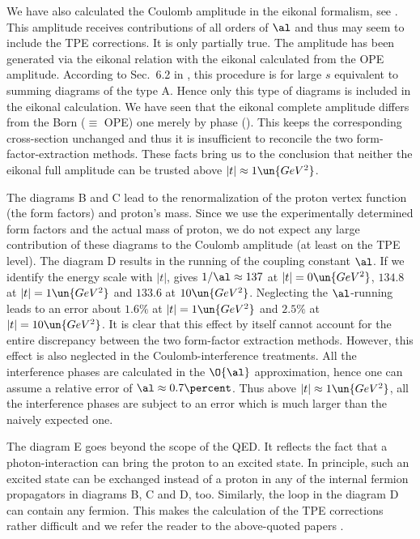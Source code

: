 We have also calculated the Coulomb amplitude in the eikonal formalism, see . This amplitude receives contributions of all orders of $\al$ and thus may seem to include the TPE corrections. It is only partially true. The amplitude has been generated via the eikonal relation  with the eikonal calculated from the OPE amplitude. According to Sec.~6.2 in , this procedure is for large $s$ equivalent to summing diagrams of the type  A. Hence only this type of diagrams is included in the eikonal calculation. We have seen that the eikonal complete amplitude differs from the Born ($\equiv$ OPE) one merely by phase (). This keeps the corresponding cross-section unchanged and thus it is insufficient to reconcile the two form-factor-extraction methods. These facts bring us to the conclusion that neither the eikonal full amplitude can be trusted above $|t|\approx 1\un{GeV^2}$.


The diagrams  B and C lead to the renormalization of the proton vertex function (the form factors) and proton's mass. Since we use the experimentally determined form factors and the actual mass of proton, we do not expect any large contribution of these diagrams to the Coulomb amplitude (at least on the TPE level). The diagram D results in the running of the coupling constant $\al$. If we identify the energy scale with $|t|$,  gives $1/\al \approx 137$ at $|t| = 0\un{GeV^2}$, $134.8$ at $|t| = 1 \un{GeV^2}$ and $133.6$ at $10\un{GeV^2}$. Neglecting the $\al$-running leads to an error about $1.6\percent$ at $|t| = 1 \un{GeV^2}$ and $2.5\percent$ at $|t| = 10 \un{GeV^2}$. It is clear that this effect by itself cannot account for the entire discrepancy between the two form-factor extraction methods. However, this effect is also neglected in the Coulomb-interference treatments. All the interference phases are calculated in the $\O{\al}$ approximation, hence one can assume a relative error of $\al\approx 0.7\percent$. Thus above $|t| \approx 1\un{GeV^2}$, all the interference phases are subject to an error which is much larger than the naively expected one.

The diagram E goes beyond the scope of the QED. It reflects the fact that a photon-interaction can bring the proton to an excited state. In principle, such an excited state can be exchanged instead of a proton in any of the internal fermion propagators in diagrams B, C and D, too. Similarly, the loop in the diagram D can contain any fermion. This makes the calculation of the TPE corrections rather difficult and we refer the reader to the above-quoted papers .


